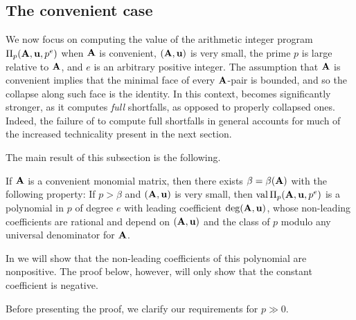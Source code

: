 \documentclass{amsart}
\begin{document}
\subsection{The convenient case}
\label{convenient: SS}

We now focus on computing the value of the arithmetic integer program $\Pi_p(\mathbf{A},\mathbf{u}, p^e)$ when $\mathbf{A}$ is convenient, $(\mathbf{A},\mathbf{u})$ is very small, the prime $p$ is large relative to $\mathbf{A}$, and $e$ is an arbitrary positive integer.
The assumption that $\mathbf{A}$ is convenient implies that the minimal face of every $\mathbf{A}$-pair is bounded, and so the collapse along such face is the identity.
In this context,  becomes significantly stronger, as it computes \emph{full} shortfalls, as opposed to properly collapsed ones.
Indeed, the failure of  to compute full shortfalls in general accounts for much of the increased technicality present in the next section.

The main result of this subsection is the following.

\begin{theorem}
   \label{m-primary AIP: T}
   If $\mathbf{A}$ is a convenient monomial matrix, then there exists $\beta=\beta(\mathbf{A})$ with the following property\textup:
   If $p > \beta$ and $(\mathbf{A},\mathbf{u})$ is very small, then $\operatorname{val} \Pi_p(\mathbf{A},\mathbf{u},p^e)$ is a polynomial in $p$ of degree $e$ with leading coefficient $\operatorname{deg}(\mathbf{A},\mathbf{u})$, whose non-leading coefficients are rational and depend on $(\mathbf{A},\mathbf{u})$ and the class of $p$ modulo any universal denominator for $\mathbf{A}$.
\end{theorem}

\begin{remark}
   In  we will show that the non-leading coefficients of this polynomial are nonpositive.
   The proof below, however, will only show that the constant coefficient is negative.
\end{remark}

Before presenting the proof, we clarify our requirements for $p\gg 0$.
\end{document}
